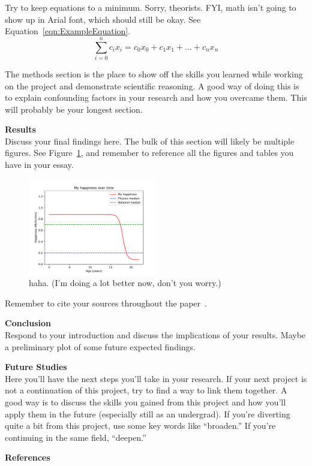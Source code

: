 \documentclass[12pt, letterpaper, twocolumn]{article}
\begin{document}
Try to keep equations to a minimum. Sorry, theorists. FYI, math isn't going to show up in Arial font, which should still be okay. See Equation~\ref{eqn:ExampleEquation}.
\begin{equation}
    \sum_{i=0}^n c_i x_i = c_0 x_0 + c_1 x_1 + ... + c_n x_n
\label{eqn:ExampleEquation}
\end{equation}

The methods section is the place to show off the skills you learned while working on the project and demonstrate scientific reasoning. A good way of doing this is to explain confounding factors in your research and how you overcame them. This will probably be your longest section.

\vspace{0.125in}
\noindent\textbf{Results}\\
Discuss your final findings here. The bulk of this section will likely be multiple figures. See Figure~\ref{fig:AnotherFigure}, and remember to reference all the figures and tables you have in your essay.

\begin{figure}[ht]
    \centering
    \includegraphics[width=0.5\textwidth]{img/happiness_plot.pdf}
    \caption{haha. (I'm doing a lot better now, don't you worry.)}
    \label{fig:AnotherFigure}
\end{figure}

Remember to cite your sources throughout the paper~\cite{this_article}.

\vspace{0.125in}
\noindent\textbf{Conclusion}\\
Respond to your introduction and discuss the implications of your results. Maybe a preliminary plot of some future expected findings.

\vspace{0.125in}
\noindent\textbf{Future Studies}\\
Here you'll have the next steps you'll take in your research. If your next project is not a continuation of this project, try to find a way to link them together. A good way is to discuss the skills you gained from this project and how you'll apply them in the future (especially still as an undergrad). If you're diverting quite a bit from this project, use some key words like ``broaden.'' If you're continuing in the same field, ``deepen.''

\vspace{0.125in}
\noindent\textbf{References}
\vspace{-0.125in}
\printbibliography[heading=none]
\end{document}
